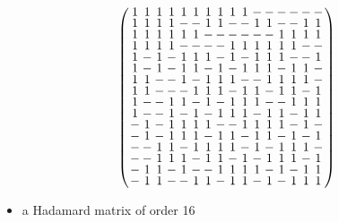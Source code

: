 \documentclass{beamer}
\begin{document}
\begin{frame}

  \[
    \arraycolsep=1.0pt\def\arraystretch{0.75}
    \left(\begin{array}{cccccccccccccccc}
            1&1&1&1&1&1&1&1&1&1&-&-&-&-&-&-\\
            1&1&1&1&-&-&1&1&-&-&1&1&-&-&1&1\\
            1&1&1&1&1&1&-&-&-&-&-&-&1&1&1&1\\
            1&1&1&1&-&-&-&-&1&1&1&1&1&1&-&-\\
            1&-&1&-&1&1&1&-&1&-&1&1&1&-&-&1\\
            1&-&1&-&1&1&-&1&-&1&1&1&-&1&1&-\\
            1&1&-&-&1&-&1&1&1&-&-&1&1&1&1&-\\
            1&1&-&-&-&1&1&1&-&1&1&-&1&1&-&1\\
            1&-&-&1&1&-&1&-&1&1&1&-&-&1&1&1\\
            1&-&-&1&-&1&-&1&1&1&-&1&1&-&1&1\\
            -&1&-&1&1&1&1&-&-&1&1&1&1&-&1&-\\
            -&1&-&1&1&1&-&1&1&-&1&1&-&1&-&1\\
            -&-&1&1&-&1&1&1&1&-&1&-&1&1&1&-\\
            -&-&1&1&1&-&1&1&-&1&-&1&1&1&-&1\\
            -&1&1&-&1&-&-&1&1&1&1&-&1&-&1&1\\
            -&1&1&-&-&1&1&-&1&1&-&1&-&1&1&1\\
    \end{array}\right)
  \]

  \begin{itemize}
    \item a Hadamard matrix of order 16
  \end{itemize}
  
\end{frame}
\end{document}
